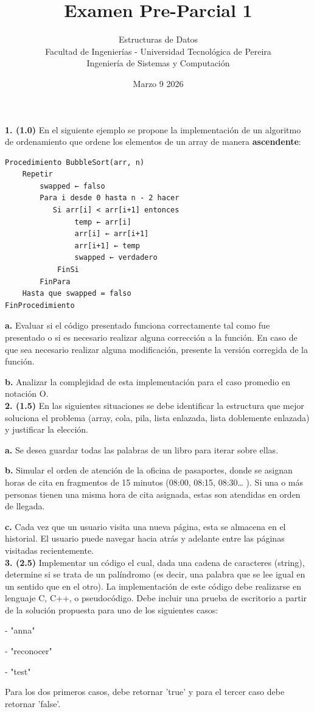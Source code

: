 \documentclass[twocolumn]{article}
\title{Examen Pre-Parcial 1}
\author{Estructuras de Datos \\ Facultad de Ingenierías - Universidad Tecnológica de Pereira \\ Ingeniería de Sistemas y Computación}
\date{Marzo 9 2026}
\begin{document}
\maketitle

\textbf{1. (1.0)} En el siguiente ejemplo se propone la implementación de un algoritmo de ordenamiento que ordene los elementos de un array de manera \textbf{ascendente}:

\begin{verbatim}
Procedimiento BubbleSort(arr, n)
    Repetir
        swapped ← falso
        Para i desde 0 hasta n - 2 hacer
           Si arr[i] < arr[i+1] entonces
                temp ← arr[i]
                arr[i] ← arr[i+1]
                arr[i+1] ← temp
                swapped ← verdadero
            FinSi
        FinPara
    Hasta que swapped = falso
FinProcedimiento
\end{verbatim}

\textbf{a.} Evaluar si el código presentado funciona correctamente tal como fue presentado o si es necesario realizar alguna corrección a la función. En caso de que sea necesario realizar alguna modificación, presente la versión corregida de la función.

\textbf{b.} Analizar la complejidad de esta implementación para el caso promedio en notación O. \\

\textbf{2. (1.5)} En las siguientes situaciones se debe identificar la estructura que mejor soluciona el problema (array, cola, pila, lista enlazada, lista doblemente enlazada) y justificar la elección. 


\textbf{a.} Se desea guardar todas las palabras de un libro para iterar sobre ellas.

\textbf{b.} Simular el orden de atención de la oficina de pasaportes, donde se asignan horas de cita en fragmentos de 15 minutos (08:00, 08:15, 08:30… ). Si una o más personas tienen una misma hora de cita asignada, estas son atendidas en orden de llegada.

\textbf{c.} Cada vez que un usuario visita una nueva página, esta se almacena en el historial. El usuario puede navegar hacia atrás y adelante entre las páginas visitadas recientemente. \\

\textbf{3. (2.5)} Implementar un código el cual, dada una cadena de caracteres (string), determine si se trata de un palíndromo (es decir, una palabra que se lee igual en un sentido que en el otro). La implementación de este código debe realizarse en lenguaje C, C++, o pseudocódigo. Debe incluir una prueba de escritorio a partir de la solución propuesta para uno de los siguientes casos:


- "anna"

- "reconocer"

- "test"

Para los dos primeros casos, debe retornar 'true' y para el tercer caso debe retornar 'false'.
\end{document}
